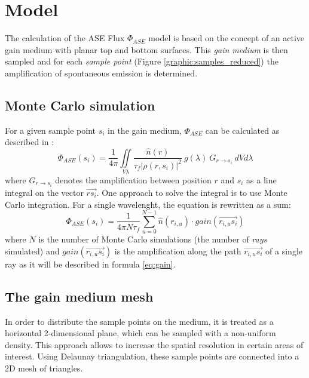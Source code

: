 \section{Model}

The calculation of the ASE Flux $\Phi_{ASE}$ model is based on the concept of an
active gain medium with planar top and bottom surfaces. This \emph{gain medium} is
then sampled and for each \emph{sample point} (Figure
\ref{graphic:samples_reduced}) the amplification of spontaneous emission is
determined. 


\subsection{Monte Carlo simulation}
\label{subsec:monteCarlo}

For a given sample point $s_i$ in the gain medium, $\Phi_{ASE}$ can
be calculated as described in \cite{ASE2010}:
\begin{equation}
  \label{eq:phi_ase_daniel} 
  \Phi_{ASE}(s_i)=\frac{1}{4\pi}\iint\limits_{V \lambda}
  \frac
    {\hat{n}(r)}
    {\tau_{f}|\rho(r,s_i)|^2}
  ~g(\lambda)
  ~G_{r\rightarrow s_i}
  ~dV d\lambda
\end{equation}
where $G_{r\rightarrow s_i}$ denotes the amplification between
position $r$ and $s_i$ as a line integral on the vector
$\overrightarrow{rs_i}$.  One approach to solve the integral is to use Monte
Carlo integration. For a single wavelenght, the equation is rewritten as a sum:
\begin{equation}
  \label{eq:monte_carlo_ase}
  \Phi_{ASE}(s_i) = 
  \frac{1}{4\pi N\tau_f}
  \sum^{N-1}_{u=0} \hat{n}(r_{i,u}) \cdot gain(\overrightarrow{r_{i,u}s_i})
\end{equation}
where $N$ is the number of Monte Carlo simulations (the number of \emph{rays}
simulated) and $gain(\overrightarrow{r_{i,u}s_i})$ is the amplification along the
path $\overrightarrow{r_{i,u}s_i}$ of a single ray as it will be described in
formula \eqref{eq:gain}.


\subsection{The gain medium mesh} \label{subsec:meshSampling}

In order to distribute the sample points on the medium, it is treated as
a horizontal 2-dimensional plane, which can be sampled with a non-uniform
density. This approach allows to increase the spatial resolution in certain
areas of interest. Using Delaunay triangulation, these sample points are
connected into a 2D mesh of triangles.

